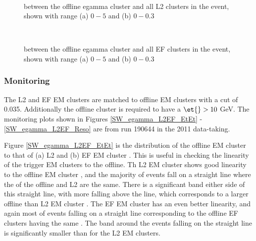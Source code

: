 \begin{figure}
\centering
\mbox{
   \quad
      \quad
}
\caption[\dr{} between offline and L2 egamma object]{\dr{} between the offline egamma cluster and all L2 clusters in the event, shown with range (a) $0 - 5$ and (b) $0 - 0.3$ \label{SW_egamma_L2_dR}}
\end{figure}

\begin{figure}
\centering
\mbox{
   \quad
      \quad
}
\caption[\dr{} between offline and EF egamma object]{\dr{} between the offline egamma cluster and all EF clusters in the event, shown with range (a) $0 - 5$ and (b) $0 - 0.3$\label{SW_egamma_EF_dR}}
\end{figure}




\subsubsection{Monitoring}


The L2 and EF EM clusters are matched to offline EM clusters with a \dr{} cut of 0.035.
Additionally the offline cluster is required to have a $\et{}>10$ GeV.  
The monitoring plots shown in Figures \ref{SW_egamma_L2EF_EtEt} -\ref{SW_egamma_L2EF_Reso} are from run 190644 in the  2011 data-taking.


Figure \ref{SW_egamma_L2EF_EtEt} is the distribution of the offline EM cluster \et{} to that of (a) L2 and (b) EF EM cluster \et{}.
This is useful in checking the linearity of the trigger EM clusters to the offline. 
Th L2 EM cluster \et{} shows good linearity to the offline EM cluster \et{}, and the majority of events fall on a straight line where the \et{} of the offline and L2 are the same.
There is a significant band either side of this straight line, with more falling above the line, which corresponds to a larger offline than L2 EM cluster \et{}.
The EF EM cluster \et{} has an even better linearity, and again most of events falling on a straight line corresponding to the offline EF clusters having the same \et{}.
The band around the events falling on the straight line is significantly smaller than for the L2 EM clusters.


